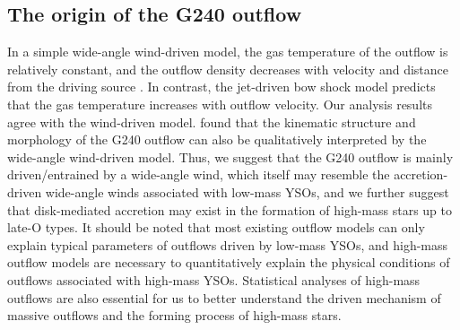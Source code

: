 \subsection{The origin of the G240 outflow}
In a simple wide-angle wind-driven model, the gas temperature of the outflow is relatively constant, and the outflow density decreases with velocity and distance from the driving source \citep{1991ApJ...370L..31S, 2007prpl.conf..245A}. In contrast, the jet-driven bow shock model predicts that the gas temperature increases with outflow velocity.
Our analysis results agree with the wind-driven model. \citet{2009ApJ...696...66Q} found that the kinematic structure and morphology of the G240 outflow can also be qualitatively interpreted by the wide-angle wind-driven model. Thus, we suggest that the G240 outflow is mainly driven/entrained by a wide-angle wind, which itself may resemble the accretion-driven wide-angle winds \citep[X-wind or disk winds:][]{2006ApJ...649..845S, 2006MNRAS.365.1131P} associated with low-mass YSOs, and we further suggest that disk-mediated accretion may exist in the formation of high-mass stars up to late-O types. It should be noted that most existing outflow models can only explain typical parameters of outflows driven by low-mass YSOs, and high-mass outflow models are necessary to quantitatively explain the physical conditions of outflows associated with high-mass YSOs. Statistical analyses of high-mass outflows are also essential for us to better understand the driven mechanism of massive outflows and the forming process of high-mass stars.
